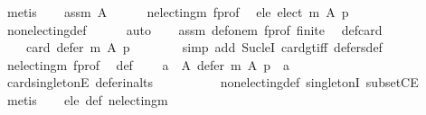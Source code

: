 \begin{isabellebody}
\ metis\isanewline
{}\isamarkupfalse%
\isanewline
\ \ \isamarkupfalse%
\ assm{\isacharcolon}{\kern0pt}\ {\isachardoublequoteopen}A\ {\isasymnoteq}\ {\isacharbraceleft}{\kern0pt}{\isacharbraceright}{\kern0pt}{\isachardoublequoteclose}\isanewline
\ \ \isamarkupfalse%
\ n{\isacharunderscore}{\kern0pt}electing{\isacharunderscore}{\kern0pt}m\ f{\isacharunderscore}{\kern0pt}prof\ \isamarkupfalse%
\ ele{\isacharcolon}{\kern0pt}\ {\isachardoublequoteopen}elect\ m\ A\ p\ {\isacharequal}{\kern0pt}\ {\isacharbraceleft}{\kern0pt}{\isacharbraceright}{\kern0pt}{\isachardoublequoteclose}\isanewline
\ \ \ \ \isamarkupfalse%
\ non{\isacharunderscore}{\kern0pt}electing{\isacharunderscore}{\kern0pt}def\isanewline
\ \ \ \ \isamarkupfalse%
\ auto\isanewline
\ \ \isamarkupfalse%
\ assm\ def{\isacharunderscore}{\kern0pt}one{\isacharunderscore}{\kern0pt}m\ f{\isacharunderscore}{\kern0pt}prof\ finite\ \isamarkupfalse%
\ def{\isacharunderscore}{\kern0pt}card{\isacharcolon}{\kern0pt}\isanewline
\ \ \ \ {\isachardoublequoteopen}card\ {\isacharparenleft}{\kern0pt}defer\ m\ A\ p{\isacharparenright}{\kern0pt}\ {\isacharequal}{\kern0pt}\ {}{\isachardoublequoteclose}\isanewline
\ \ \ \ \isamarkupfalse%
\ {\isacharparenleft}{\kern0pt}simp\ add{\isacharcolon}{\kern0pt}\ Suc{\isacharunderscore}{\kern0pt}leI\ card{\isacharunderscore}{\kern0pt}gt{\isacharunderscore}{\kern0pt}{}{\isacharunderscore}{\kern0pt}iff\ defers{\isacharunderscore}{\kern0pt}def{\isacharparenright}{\kern0pt}\isanewline
\ \ \isamarkupfalse%
\ n{\isacharunderscore}{\kern0pt}electing{\isacharunderscore}{\kern0pt}m\ f{\isacharunderscore}{\kern0pt}prof\ \isamarkupfalse%
\ def{\isacharcolon}{\kern0pt}\isanewline
\ \ \ \ {\isachardoublequoteopen}{\isasymexists}a\ {\isasymin}\ A{\isachardot}{\kern0pt}\ defer\ m\ A\ p\ {\isacharequal}{\kern0pt}\ {\isacharbraceleft}{\kern0pt}a{\isacharbraceright}{\kern0pt}{\isachardoublequoteclose}\isanewline
\ \ \ \ \isamarkupfalse%
\ card{\isacharunderscore}{\kern0pt}{}{\isacharunderscore}{\kern0pt}singletonE\ defer{\isacharunderscore}{\kern0pt}in{\isacharunderscore}{\kern0pt}alts\isanewline
\ \ \ \ \ \ \ \ \ \ non{\isacharunderscore}{\kern0pt}electing{\isacharunderscore}{\kern0pt}def\ singletonI\ subsetCE\isanewline
\ \ \ \ \isamarkupfalse%
\ metis\isanewline
\ \ \isamarkupfalse%
\ ele\ def\ n{\isacharunderscore}{\kern0pt}electing{\isacharunderscore}{\kern0pt}m\ \isamarkupfalse%

\end{isabellebody}
